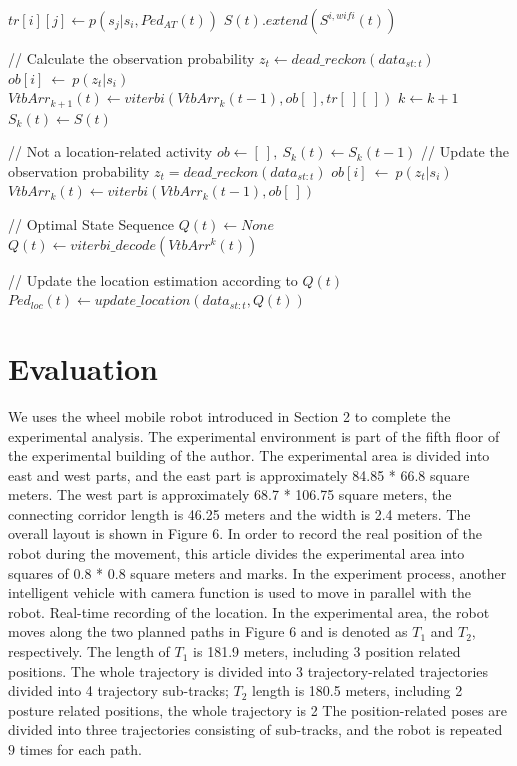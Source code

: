 \documentclass{llncs}
\begin{document}
\begin{algorithm}[t]
	\begin{algorithmic}[1]

		\STATE $tr[i][j] \leftarrow p(s_j|s_i,{Ped_{AT}(t)})$
		\ENDFOR
		\STATE $S(t).extend(S^{i,wifi}(t))$
		\ENDFOR
		
		\STATE // Calculate the observation probability		    
		\STATE ${z_t} \leftarrow dead\_reckon(data_{st:t})$
		\STATE $ob[i]\ \leftarrow\ p(z_t|s_i)$
		\ENDFOR
		\STATE ${VtbArr}_{k+1}(t) \leftarrow viterbi({VtbArr}_{k}(t-1), ob[\ ], tr[\ ][\ ])$
		\STATE $k \leftarrow k+1$
		\STATE $S_{k}(t) \leftarrow S(t)$
		
		\ELSE // Not a location-related activity
		\STATE $ob \leftarrow [\ ],\ S_{k}(t) \leftarrow S_{k}(t-1)$
		\STATE // Update the observation probability
		\STATE ${z_t}=dead\_reckon(data_{st:t})$
		\STATE $ob[i]\ \leftarrow\ p(z_t|s_i)$
		\ENDFOR
		\STATE ${VtbArr}_{k}(t) \leftarrow viterbi({VtbArr}_{k}(t-1), ob[\ ])$
		\ENDIF	
		
		\STATE // Optimal State Sequence
		\STATE ${Q(t)} \leftarrow None$
		\STATE ${Q(t)} \leftarrow viterbi\_decode(VtbArr^{k}(t))$
		\ENDIF
		
		\STATE // Update the location estimation according to $Q(t)$
		\STATE $Ped_{loc}(t) \leftarrow update\_location(data_{st:t}, Q(t))$
	\end{algorithmic}
\end{algorithm}
\vspace{-10pt}


\section{Evaluation}

We uses the wheel mobile robot introduced in Section 2 to complete the experimental analysis. The experimental environment is part of the fifth floor of the experimental building of the author. The experimental area is divided into east and west parts, and the east part is approximately 84.85 * 66.8 square meters. The west part is approximately 68.7 * 106.75 square meters, the connecting corridor length is 46.25 meters and the width is 2.4 meters. The overall layout is shown in Figure 6. In order to record the real position of the robot during the movement, this article divides the experimental area into squares of 0.8 * 0.8 square meters and marks. In the experiment process, another intelligent vehicle with camera function is used to move in parallel with the robot. Real-time recording of the location. In the experimental area, the robot moves along the two planned paths in Figure 6 and is denoted as $T_1$ and $T_2$, respectively. The length of $T_1$ is 181.9 meters, including 3 position related positions. The whole trajectory is divided into 3 trajectory-related trajectories divided into 4 trajectory sub-tracks; $T_2$ length is 180.5 meters, including 2 posture related positions, the whole trajectory is 2 The position-related poses are divided into three trajectories consisting of sub-tracks, and the robot is repeated $9$ times for each path.
\end{document}
